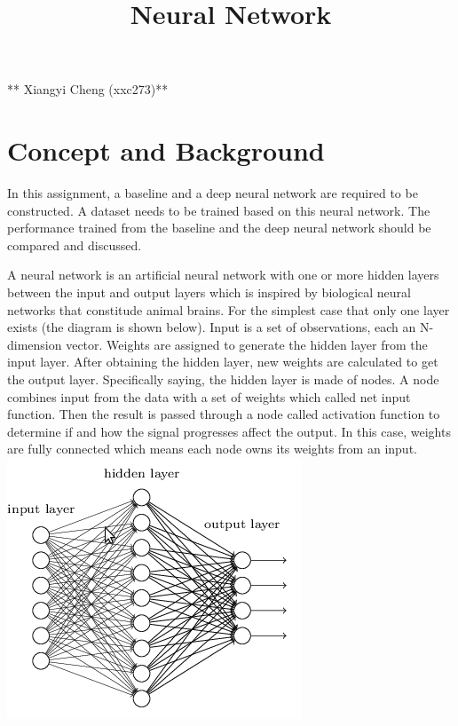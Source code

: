 \documentclass[11pt]{article}
\title{Neural Network}
\makeatletter
\def\maxwidth{\ifdim\Gin@nat@width>\linewidth\linewidth
    \else\Gin@nat@width\fi}
\let\Oldincludegraphics\includegraphics
\renewcommand{\includegraphics}[1]{\Oldincludegraphics[width=.8\maxwidth]{#1}}
\makeatother
\begin{document}
    
    
    \maketitle
    
    

    
    ** Xiangyi Cheng (xxc273)**

    \hypertarget{concept-and-background}{%
\section{Concept and Background}\label{concept-and-background}}

    In this assignment, a baseline and a deep neural network are required to
be constructed. A dataset needs to be trained based on this neural
network. The performance trained from the baseline and the deep neural
network should be compared and discussed.

    A neural network is an artificial neural network with one or more hidden
layers between the input and output layers which is inspired by
biological neural networks that constitude animal brains. For the
simplest case that only one layer exists (the diagram is shown below).
Input is a set of observations, each an N-dimension vector. Weights are
assigned to generate the hidden layer from the input layer. After
obtaining the hidden layer, new weights are calculated to get the output
layer. Specifically saying, the hidden layer is made of nodes. A node
combines input from the data with a set of weights which called net
input function. Then the result is passed through a node called
activation function to determine if and how the signal progresses affect
the output. In this case, weights are fully connected which means each
node owns its weights from an input. \includegraphics{nn.png}
\end{document}
